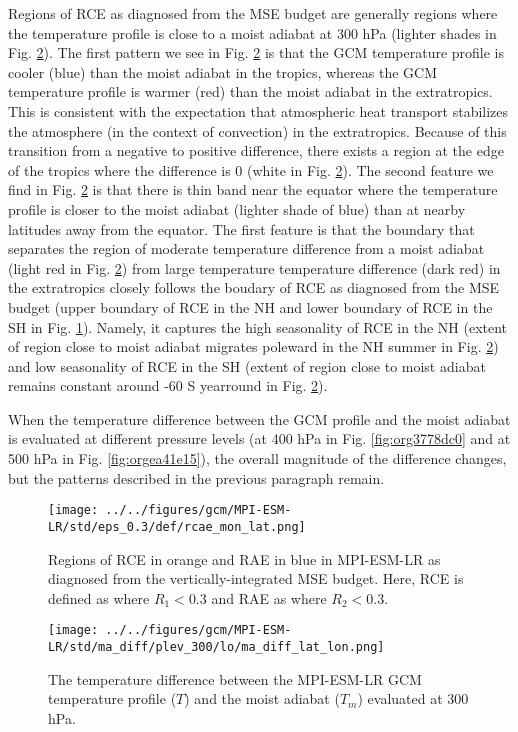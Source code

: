 \documentclass[11pt]{article}
\begin{document}
Regions of RCE as diagnosed from the MSE budget are generally regions where the temperature profile is close to a moist adiabat at 300 hPa (lighter shades in Fig. \ref{fig:org91f707c}). The first pattern we see in Fig. \ref{fig:org91f707c} is that the GCM temperature profile is cooler (blue) than the moist adiabat in the tropics, whereas the GCM temperature profile is warmer (red) than the moist adiabat in the extratropics. This is consistent with the expectation that atmospheric heat transport stabilizes the atmosphere (in the context of convection) in the extratropics. Because of this transition from a negative to positive difference, there exists a region at the edge of the tropics where the difference is 0 (white in Fig. \ref{fig:org91f707c}). The second feature we find in Fig. \ref{fig:org91f707c} is that there is thin band near the equator where the temperature profile is closer to the moist adiabat (lighter shade of blue) than at nearby latitudes away from the equator. The first feature is that the boundary that separates the region of moderate temperature difference from a moist adiabat (light red in Fig. \ref{fig:org91f707c}) from large temperature temperature difference (dark red) in the extratropics closely follows the boudary of RCE as diagnosed from the MSE budget (upper boundary of RCE in the NH and lower boundary of RCE in the SH in Fig. \ref{fig:org883ac76}). Namely, it captures the high seasonality of RCE in the NH (extent of region close to moist adiabat migrates poleward in the NH summer in Fig. \ref{fig:org91f707c}) and low seasonality of RCE in the SH (extent of region close to moist adiabat remains constant around -60 S yearround in Fig. \ref{fig:org91f707c}).

When the temperature difference between the GCM profile and the moist adiabat is evaluated at different pressure levels (at 400 hPa in Fig. \ref{fig:org3778dc0} and at 500 hPa in Fig. \ref{fig:orgea41e15}), the overall magnitude of the difference changes, but the patterns described in the previous paragraph remain.

\begin{figure}[htbp]
\centering
\texttt{[image: ../../figures/gcm/MPI-ESM-LR/std/eps\_0.3/def/rcae\_mon\_lat.png]}
\caption{\label{fig:org883ac76}Regions of RCE in orange and RAE in blue in MPI-ESM-LR as diagnosed from the vertically-integrated MSE budget. Here, RCE is defined as where \(R_1 < 0.3\) and RAE as where \(R_2 < 0.3\).}
\end{figure}

\begin{figure}[htbp]
\centering
\texttt{[image: ../../figures/gcm/MPI-ESM-LR/std/ma\_diff/plev\_300/lo/ma\_diff\_lat\_lon.png]}
\caption{\label{fig:org91f707c}The temperature difference between the MPI-ESM-LR GCM temperature profile (\(T\)) and the moist adiabat (\(T_m\)) evaluated at 300 hPa.}
\end{figure}
\end{document}
